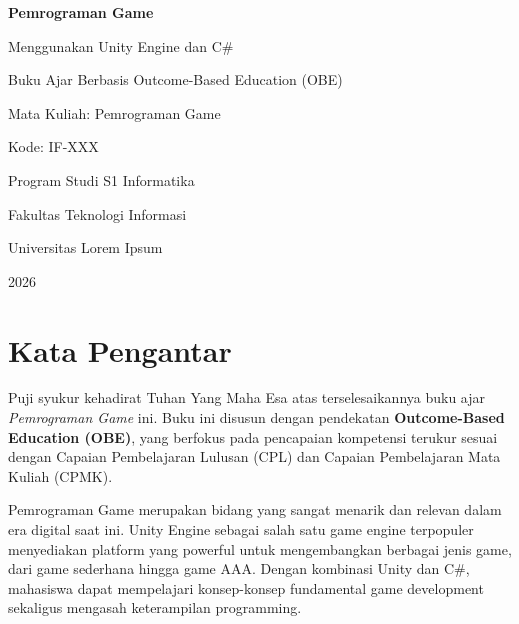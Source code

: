 \frontmatter

\begin{titlepage}
  \centering
  \vspace*{1cm}
  {\LARGE\bfseries Pemrograman Game\par}
  \vspace{0.5cm}
  {\large Menggunakan Unity Engine dan C\#\par}
  \vspace{0.5cm}
  {\large Buku Ajar Berbasis Outcome-Based Education (OBE)\par}
  \vspace{1cm}
  {\large Mata Kuliah: Pemrograman Game\par}
  {\large Kode: IF-XXX\par}
  \vspace{2cm}
  {\large Program Studi S1 Informatika\par}
  {\large Fakultas Teknologi Informasi\par}
  {\large Universitas Lorem Ipsum\par}
  \vfill
  {\large 2026\par}
\end{titlepage}

\cleardoublepage

\chapter*{Kata Pengantar}

Puji syukur kehadirat Tuhan Yang Maha Esa atas terselesaikannya buku ajar \textit{Pemrograman Game} ini. Buku ini disusun dengan pendekatan \textbf{Outcome-Based Education (OBE)}, yang berfokus pada pencapaian kompetensi terukur sesuai dengan Capaian Pembelajaran Lulusan (CPL) dan Capaian Pembelajaran Mata Kuliah (CPMK).

Pemrograman Game merupakan bidang yang sangat menarik dan relevan dalam era digital saat ini. Unity Engine sebagai salah satu game engine terpopuler menyediakan platform yang powerful untuk mengembangkan berbagai jenis game, dari game sederhana hingga game AAA. Dengan kombinasi Unity dan C\#, mahasiswa dapat mempelajari konsep-konsep fundamental game development sekaligus mengasah keterampilan programming.


